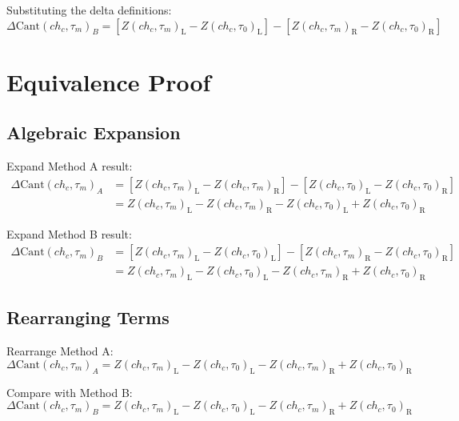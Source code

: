 \documentclass{article}
\newcommand{\chainage}[1]{ch_{#1}}
\newcommand{\time}[1]{\tau_{#1}}
\newcommand{\Left}{\text{L}}
\newcommand{\Right}{\text{R}}
\newcommand{\Z}[3]{Z(#1, #2)_{#3}}
\newcommand{\DCant}[2]{\Delta\text{Cant}(#1, #2)}
\begin{document}
Substituting the delta definitions:
\begin{equation}
\DCant{\chainage{c}}{\time{m}}_B = \left[\Z{\chainage{c}}{\time{m}}{\Left} - \Z{\chainage{c}}{\time{0}}{\Left}\right] - \left[\Z{\chainage{c}}{\time{m}}{\Right} - \Z{\chainage{c}}{\time{0}}{\Right}\right]
\end{equation}

\section{Equivalence Proof}

\subsection{Algebraic Expansion}
Expand Method A result:
\begin{align}
\DCant{\chainage{c}}{\time{m}}_A &= \left[\Z{\chainage{c}}{\time{m}}{\Left} - \Z{\chainage{c}}{\time{m}}{\Right}\right] - \left[\Z{\chainage{c}}{\time{0}}{\Left} - \Z{\chainage{c}}{\time{0}}{\Right}\right] \\
&= \Z{\chainage{c}}{\time{m}}{\Left} - \Z{\chainage{c}}{\time{m}}{\Right} - \Z{\chainage{c}}{\time{0}}{\Left} + \Z{\chainage{c}}{\time{0}}{\Right}
\end{align}

Expand Method B result:
\begin{align}
\DCant{\chainage{c}}{\time{m}}_B &= \left[\Z{\chainage{c}}{\time{m}}{\Left} - \Z{\chainage{c}}{\time{0}}{\Left}\right] - \left[\Z{\chainage{c}}{\time{m}}{\Right} - \Z{\chainage{c}}{\time{0}}{\Right}\right] \\
&= \Z{\chainage{c}}{\time{m}}{\Left} - \Z{\chainage{c}}{\time{0}}{\Left} - \Z{\chainage{c}}{\time{m}}{\Right} + \Z{\chainage{c}}{\time{0}}{\Right}
\end{align}

\subsection{Rearranging Terms}
Rearrange Method A:
\begin{equation}
\DCant{\chainage{c}}{\time{m}}_A = \Z{\chainage{c}}{\time{m}}{\Left} - \Z{\chainage{c}}{\time{0}}{\Left} - \Z{\chainage{c}}{\time{m}}{\Right} + \Z{\chainage{c}}{\time{0}}{\Right}
\end{equation}

Compare with Method B:
\begin{equation}
\DCant{\chainage{c}}{\time{m}}_B = \Z{\chainage{c}}{\time{m}}{\Left} - \Z{\chainage{c}}{\time{0}}{\Left} - \Z{\chainage{c}}{\time{m}}{\Right} + \Z{\chainage{c}}{\time{0}}{\Right}
\end{equation}
\end{document}
